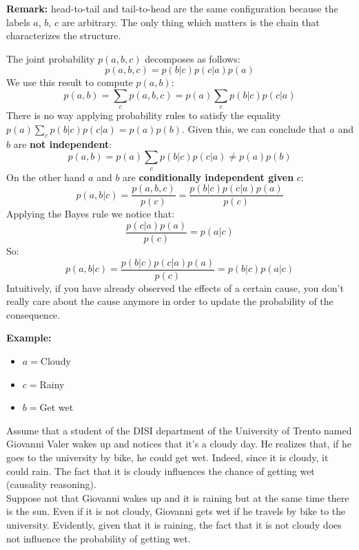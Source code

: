 \textbf{Remark:} head-to-tail and tail-to-head are the same configuration because
the labels $a$, $b$, $c$ are arbitrary. The only thing which matters is the
chain that characterizes the structure.
\newline

The joint probability $p(a,b,c)$ decomposes as follows:
\[
	p(a,b,c) = p(b|c)p(c|a)p(a)
\]
We use this result to compute $p(a,b)$:
\[
	p(a,b) = \sum_{c}p(a,b,c) = p(a) \sum_{c}p(b|c)p(c|a)
\]
There is no way applying probability rules to satisfy the equality
$p(a) \sum_{c}p(b|c)p(c|a) = p(a)p(b)$. Given this, we can conclude that $a$ and
$b$ are \textbf{not independent}:
\[
	p(a,b) = p(a)\sum_{c}p(b|c)p(c|a) \neq p(a)p(b)
\]
On the other hand $a$ and $b$ are \textbf{conditionally independent given} $c$:
\[
	p(a,b | c) = \frac{p(a,b,c)}{p(c)}= \frac{p(b|c)p(c|a)p(a)}{p(c)}
\]
Applying the Bayes rule we notice that:
\[
	\frac{p(c|a)p(a)}{p(c)}= p(a|c)
\]
So:
\[
	p(a,b | c) = \frac{p(b|c)p(c|a)p(a)}{p(c)}= p(b|c)p(a|c)
\]
Intuitively, if you have already observed the effects of a certain cause, you
don't really care about the cause anymore in order to update the probability of
the consequence.
\newline

\textbf{Example:}
\begin{itemize}
	\item $a=$Cloudy

	\item $c=$Rainy

	\item $b=$Get wet
\end{itemize}
Assume that a student of the DISI department of the University of Trento named Giovanni
Valer wakes up and notices that it's a cloudy day. He realizes that, if he goes to
the university by bike, he could get wet. Indeed, since it is cloudy, it could rain.
The fact that it is cloudy influences the chance of getting wet (causality reasoning).\\
Suppose not that Giovanni wakes up and it is raining but at the same time there
is the sun. Even if it is not cloudy, Giovanni gets wet if he travels by bike to
the university. Evidently, given that it is raining, the fact that it is not cloudy
does not influence the probability of getting wet.


